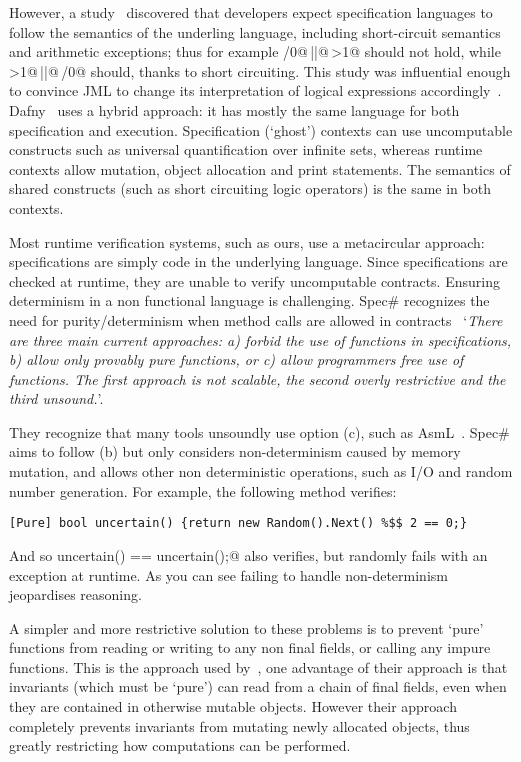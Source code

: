 However, a study~\cite{chalin2007logical} discovered that developers expect specification languages to follow the semantics of the underling language, including short-circuit semantics and arithmetic exceptions; thus for example /0@\,\Q@||@\,>1@ should not hold, while >1@\,\Q@||@\,/0@ should, thanks to short circuiting.
This study was influential enough to convince JML to change its interpretation of logical expressions
accordingly~\cite{chalin2008jml}.
Dafny~\cite{DBLP:conf/sigada/Leino12} uses a hybrid approach: it has mostly the same language for both specification and execution. Specification (`ghost') contexts can use uncomputable constructs such as universal quantification over infinite sets, whereas runtime contexts allow mutation, object allocation and print statements. The semantics of shared constructs (such as short circuiting logic operators) is the same in both contexts.

Most runtime verification systems, such as ours, use a metacircular approach: specifications are simply code in the underlying language. Since specifications are checked at runtime, they are unable to verify uncomputable contracts.
 Ensuring determinism in a non functional language is challenging. Spec\# recognizes the need for purity/determinism when method calls are allowed in contracts~\cite{barnett200499} `\emph{There are three main current approaches: a) forbid the use of functions in specifications, b) allow only provably pure functions, or c) allow programmers free use
	of functions. The first approach is not scalable, the second overly restrictive and
	the third unsound.}'.

They recognize that many tools unsoundly use option (c), such as AsmL~\cite{barnett2003runtime}.
Spec\# aims to follow (b) but only considers non-determinism caused by memory mutation, and allows other non deterministic operations, such as I/O and random number generation. For example, the following method verifies:
\begin{lstlisting}
[Pure] bool uncertain() {return new Random().Next() %$$ 2 == 0;}
\end{lstlisting}

And so \Q@assert uncertain() == uncertain();@ also verifies, but randomly fails with an exception at runtime.
As you can see failing to handle non-determinism jeopardises reasoning.

A simpler and more restrictive solution to these problems is to prevent `pure' functions from reading or writing to any non final fields, or calling any impure functions. This is the approach used by~\cite{Flanagan06hybridtypes}, one advantage of their approach is that invariants (which must be `pure') can read from a chain of final fields, even when they are contained in otherwise mutable objects. However their approach completely prevents invariants from mutating newly allocated objects, thus greatly restricting how computations can be performed.
\saveSpace

